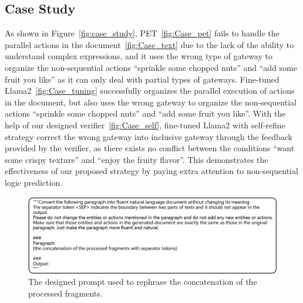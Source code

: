 \phantom{Invisible Text}
\vspace{-\baselineskip}


\subsection{Case Study
}

As shown in Figure~\ref{fig:case_study}, PET~\ref{fig:Case_pet} fails to handle the parallel actions in the document~\ref{fig:Case_text} due to the lack of the ability to understand complex expressions, and it uses the wrong type of gateway to organize the non-sequential actions ``sprinkle some chopped nuts'' and ``add some fruit you like'' as it can only deal with partial types of gateways. Fine-tuned Llama2~\ref{fig:Case_tuning} successfully organizes the parallel execution of actions in the document, but also uses the wrong gateway to organize the non-sequential actions ``sprinkle some chopped nuts'' and ``add some fruit you like''. With the help of our designed verifier~\ref{fig:Case_self}, fine-tuned Llama2 with self-refine strategy correct the wrong gateway into inclusive gateway through the feedback provided by the verifier, as there exists no conflict between the conditions ``want some crispy texture'' and ``enjoy the fruity flavor''. This demonstrates the effectiveness of our proposed strategy by paying extra attention to non-sequential logic prediction.

\begin{figure}[th]
    \centering
    \includegraphics[width=\textwidth]{figures/prompt/Rephrase.png}

    \caption{The designed prompt used to rephrase the concatenation of the processed fragments.
    }
    \label{fig:Rephrase}
    \vspace*{-0cm}

\end{figure}

